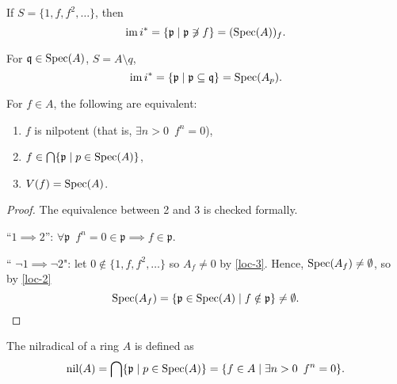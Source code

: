 \begin{corollary}
  If $S = \{1, f, f^2, \ldots \}$, then
  \[ \operatorname*{im} i^* = \{ \mathfrak p \mathrel{|} \mathfrak p \not\ni f\} = (\text{Spec}(A))_f. \]
\end{corollary}

\begin{corollary}
  For $\mathfrak q \in \text{Spec}(A)$, $S = A \setminus q$,
  \[ \operatorname*{im} i^* = \{ \mathfrak p \mathrel{|} \mathfrak p \subseteq \mathfrak q \} = \text{Spec}(A_p). \]
\end{corollary}

\begin{corollary}
  For $f \in A$, the following are equivalent:
  \begin{enumerate}
  \item $f$ is nilpotent (that is, $\exists n > 0 \enspace f^n = 0$),
  \item $f \in \bigcap \{\mathfrak p \mathrel{|} p \in \text{Spec}(A) \}$,
  \item $V(f) = \text{Spec}(A)$.
  \end{enumerate}
\end{corollary}

\begin{proof}
  The equivalence between 2 and 3 is checked formally.

  ``$1 \implies 2$'': $\forall \mathfrak p \enspace f^n = 0 \in \mathfrak p \implies f \in \mathfrak p$.

  `` $\neg 1 \implies \neg 2$":
  let
  $0 \notin \{ 1, f, f^2, \dotsc \}$
  so $A_f \neq 0$ by \cref{loc-3}.
  Hence, $\text{Spec}(A_f) \neq \emptyset$, so by \cref{loc-2}
  \[ \text{Spec}(A_f) = \{ \mathfrak p \in \text{Spec}(A) \mathrel{|} f \notin \mathfrak p \} \neq \emptyset .\]
\end{proof}

\begin{df}
  The nilradical of a ring $A$ is defined as
  \[ \text{nil}(A) = \bigcap \{ \mathfrak p \mathrel{|} p \in \text{Spec}(A) \} = \{f \in A \mathrel{|} \exists n > 0 \enspace f^n = 0 \}.\]
\end{df}

